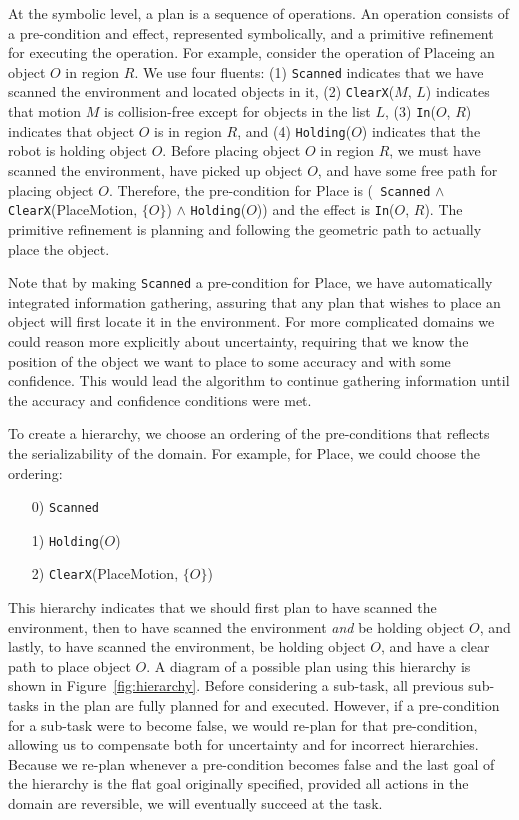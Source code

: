 \documentclass[letterpaper, 10 pt, conference]{ieeeconf}  %
\begin{document}
At the symbolic level, a plan is a sequence of operations.  An
operation consists of a pre-condition and effect, represented
symbolically, and a primitive refinement for executing the operation.
For example, consider the operation of {\sc Place}ing an
object $O$ in region $R$.  We use four fluents: 
(1) {\tt Scanned} indicates that we have scanned the environment and
  located objects in it,
(2) {\tt ClearX}($M$, $L$) indicates that motion $M$ is
  collision-free except for objects in the list $L$,
(3) {\tt In}($O$, $R$) indicates that object $O$ is in region $R$,
and (4) {\tt Holding}($O$) indicates that the robot is holding object
  $O$.
Before placing object $O$ in region $R$, we must have scanned the
environment, have picked up
object $O$, and have some free path for placing object $O$.
Therefore, the pre-condition for {\sc Place} is ({\tt
  Scanned} $\wedge$ {\tt ClearX}(PlaceMotion, $\{O\}$)
$\wedge$ {\tt Holding}($O$)) and the effect is {\tt In}($O$, $R$).
The primitive refinement is planning and following the
geometric path to
actually place the object.

Note that by making {\tt Scanned} a pre-condition for {\sc Place}, we
have automatically integrated information gathering, assuring that any
plan that wishes to place an object will first locate it in the
environment.  For more
complicated
domains we could reason more explicitly about uncertainty,
requiring that we know the position of the object we want to
place to some accuracy and with some confidence.  This would lead the
algorithm to continue gathering information until the accuracy and
confidence conditions were met.


To create a hierarchy, we choose an ordering of the pre-conditions
that reflects the serializability of the domain.
For example, for {\sc Place}, we could choose the ordering:
\begin{itemize}
\item[0)] {\tt Scanned}
\item[1)] {\tt Holding}($O$)
\item[2)] {\tt ClearX}(PlaceMotion, $\{O\}$)
\end{itemize}
This hierarchy indicates that we should first plan to have scanned the
environment, then to have scanned the environment
{\em and} be holding object $O$, and lastly, to have scanned the
environment, be holding object $O$, and have a clear path to place
object $O$.  A diagram of a possible plan using this hierarchy is
shown in
Figure~\ref{fig:hierarchy}. Before considering a sub-task, all
previous sub-tasks in the plan are fully planned for and executed.
However, if a pre-condition for a sub-task were to become false, we
would re-plan for that pre-condition, allowing us to compensate both
for uncertainty and for 
incorrect hierarchies.  Because we re-plan whenever a pre-condition
becomes 
false and the last goal of the hierarchy is the flat goal originally
specified,
provided all actions in the domain are reversible, we will eventually
succeed at the task.
\end{document}
